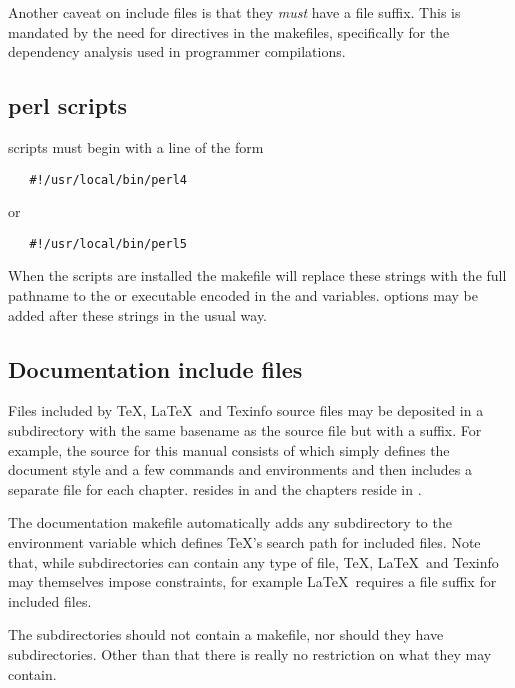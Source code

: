 Another caveat on include files is that they {\em must} have a 
file suffix.  This is mandated by the need for  directives in the
makefiles, specifically for the dependency analysis used in programmer
compilations.

\subsection*{perl scripts}

 scripts must begin with a line of the form

\begin{verbatim}
   #!/usr/local/bin/perl4
\end{verbatim}

\noindent
or

\begin{verbatim}
   #!/usr/local/bin/perl5
\end{verbatim}

\noindent
When the scripts are installed the makefile will replace these strings with
the full pathname to the  or  executable encoded
in the  and   variables.  
options may be added after these strings in the usual way.

\subsection*{Documentation include files}

Files included by \TeX , \LaTeX\, and Texinfo source files may be deposited in
a subdirectory with the same basename as the source file but with a
 suffix.  For example, the source for this manual consists of
 which simply defines the document style and a few commands
and environments and then includes a separate  file for each
chapter.   resides in  and
the chapters reside in .

The documentation makefile automatically adds any  subdirectory to
the  environment variable which defines \TeX 's search path
for included files.  Note that, while  subdirectories can contain
any type of file, \TeX , \LaTeX\, and Texinfo may themselves impose
constraints, for example \LaTeX\ requires a  file suffix for
included files.

The  subdirectories should not contain a makefile, nor should they
have subdirectories.  Other than that there is really no restriction on
what they may contain.

